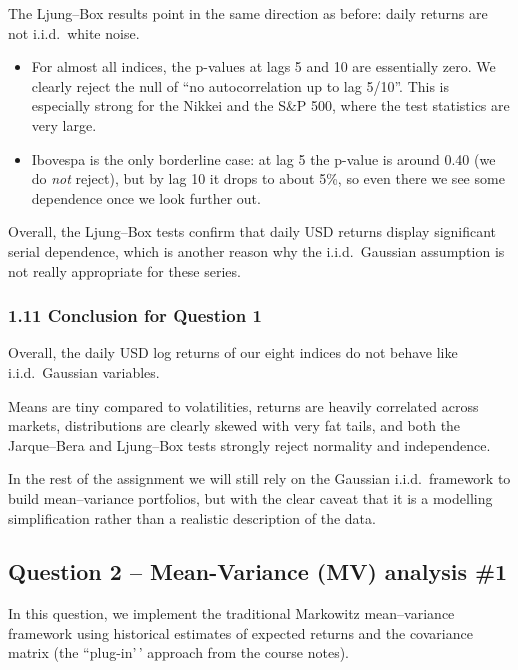 \documentclass[11pt]{article}
\begin{document}
    The Ljung--Box results point in the same direction as before: daily
returns are not i.i.d.~white noise.

\begin{itemize}
  \item For almost all indices, the p-values at lags 5 and 10 are essentially zero. We clearly
  reject the null of ``no autocorrelation up to lag 5/10''. This is especially strong for
  the Nikkei and the S\&P 500, where the test statistics are very large.
  \item Ibovespa is the only borderline case: at lag 5 the p-value is around 0.40 (we do \emph{not}
  reject), but by lag 10 it drops to about 5\%, so even there we see some dependence once
  we look further out.
\end{itemize}

Overall, the Ljung--Box tests confirm that daily USD returns display
significant serial dependence, which is another reason why the
i.i.d.~Gaussian assumption is not really appropriate for these series.

    \hypertarget{conclusion-for-question-1}{%
\subsubsection{1.11 Conclusion for Question
1}\label{conclusion-for-question-1}}

Overall, the daily USD log returns of our eight indices do not behave
like i.i.d.~Gaussian variables.

Means are tiny compared to volatilities, returns are heavily correlated
across markets, distributions are clearly skewed with very fat tails,
and both the Jarque--Bera and Ljung--Box tests strongly reject normality
and independence.

In the rest of the assignment we will still rely on the Gaussian
i.i.d.~framework to build mean--variance portfolios, but with the clear
caveat that it is a modelling simplification rather than a realistic
description of the data.

    \hypertarget{question-2-mean-variance-mv-analysis-1}{%
\subsection{Question 2 -- Mean-Variance (MV) analysis
\#1}\label{question-2-mean-variance-mv-analysis-1}}

In this question, we implement the traditional Markowitz mean--variance
framework using historical estimates of expected returns and the
covariance matrix (the ``plug-in'\,' approach from the course notes).
\end{document}
